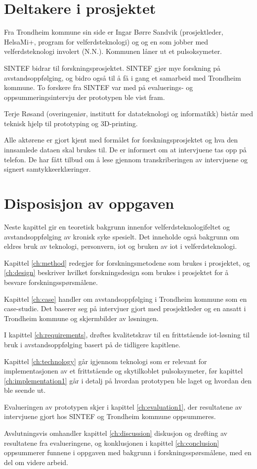\section{Deltakere i prosjektet}
Fra Trondheim kommune sin side er Ingar Børre Sandvik (prosjektleder, HelsaMi+, program for velferdsteknologi) og
og en som jobber med velferdsteknologi involert (N.N.). Kommunen låner ut et pulsoksymeter.

SINTEF bidrar til forskningsprosjektet. SINTEF gjør mye forskning på
avstandsoppfølging, og bidro også til å få i gang et samarbeid med Trondheim kommune.
To forskere fra SINTEF var med på evaluerings- og oppsummeringsintervju der prototypen
ble vist fram.

Terje Røsand (overingeniør, institutt for datateknologi og informatikk) bistår med teknisk hjelp til prototyping og 3D-printing.

Alle aktørene er gjort kjent med formålet for forskningsprosjektet og hva den innsamlede dataen skal brukes til. De er informert om at
intervjuene tas opp på telefon. De har fått tilbud om å lese gjennom transkriberingen av intervjuene og signert
samtykkeerklæringer.

\section{Disposisjon av oppgaven}
Neste kapittel gir en teoretisk bakgrunn innenfor velferdsteknologifeltet og avstandsoppfølging av kronisk syke spesielt.
Det inneholde også bakgrunn om eldres bruk av teknologi, personvern, \gls{iot} og bruken av \gls{iot} i velferdsteknologi.

Kapittel \ref{ch:method} redegjør for forskningsmetodene som brukes i prosjektet, og \ref{ch:design} beskriver hvilket forskningsdesign som brukes i prosjektet for å besvare forskningsspørsmålene.

Kapittel \ref{ch:case} handler om avstandsoppfølging i Trondheim kommune som en case-studie. Det baserer seg på intervjuer gjort med
prosjektleder og en ansatt i Trondheim kommune og skjermbilder av løsningen.

I kapittel \ref{ch:requirements}, drøftes kvalitetskrav til en frittstående \gls{iot}-løsning til bruk i avstandsoppfølging basert på de tidligere
kapitlene.

Kapittel \ref{ch:technology} går igjennom teknologi som er relevant for implementasjonen av et frittstående og skytilkoblet pulsoksymeter,
før kapittel \ref{ch:implementation1} går i detalj på hvordan prototypen ble laget og hvordan den ble seende ut.

Evalueringen av prototypen skjer i kapittel \ref{ch:evaluation1}, der resultatene av intervjuene gjort hos SINTEF og Trondheim kommune oppsummeres.

Avslutningsvis omhandler kapittel \ref{ch:discussion} diskusjon og drøfting av resultatene fra evalueringene, og konklusjonen i kapittel \ref{ch:conclusion}
oppsummerer funnene i oppgaven med bakgrunn i forskningsspørsmålene, med en del om videre arbeid.
